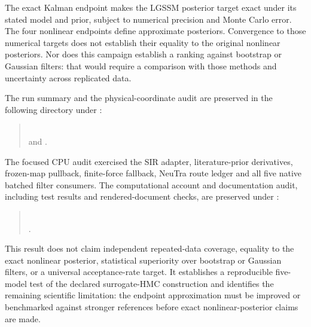 The exact Kalman endpoint makes the LGSSM posterior target exact under its
stated model and prior, subject to numerical precision and Monte Carlo error.
The four nonlinear endpoints define approximate posteriors.  Convergence to
those numerical targets does not establish their equality to the original
nonlinear posteriors.  Nor does this campaign establish a ranking against
bootstrap or Gaussian filters: that would require a comparison with those
methods and uncertainty across replicated data.

The run summary and the physical-coordinate audit are preserved in the
following directory under :
\begin{quote}\small
{}\\
 and .
\end{quote}
The focused CPU audit exercised the SIR adapter, literature-prior derivatives,
frozen-map pullback, finite-force fallback, NeuTra route ledger and all five
native batched filter consumers.  The computational account and documentation
audit, including test results and rendered-document checks, are preserved under
:
\begin{quote}\small
{}\\
.
\end{quote}

This result does not claim independent repeated-data coverage, equality to the
exact nonlinear posterior, statistical superiority over bootstrap or Gaussian
filters, or a universal acceptance-rate target.  It establishes a reproducible
five-model test of the declared surrogate-HMC construction and identifies the
remaining scientific limitation: the endpoint approximation must be improved or
benchmarked against stronger references before exact nonlinear-posterior claims
are made.
